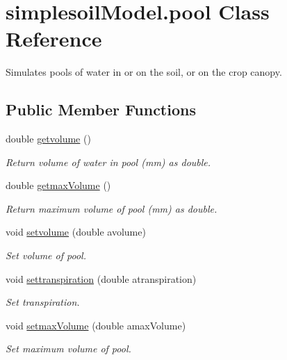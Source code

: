 \hypertarget{classsimplesoil_model_1_1pool}{}\section{simplesoil\+Model.\+pool Class Reference}
\label{classsimplesoil_model_1_1pool}


Simulates pools of water in or on the soil, or on the crop canopy.  


\subsection*{Public Member Functions}
\begin{DoxyCompactItemize}
\item 
double \mbox{\hyperlink{classsimplesoil_model_1_1pool_a29dc8988f752b7b7e1189d2442a431bd}{getvolume}} ()
\begin{DoxyCompactList}\small\item\em Return volume of water in pool (mm) as double. \end{DoxyCompactList}\item 
double \mbox{\hyperlink{classsimplesoil_model_1_1pool_ae038949bd94e78acf1fca1e82e6eae30}{getmax\+Volume}} ()
\begin{DoxyCompactList}\small\item\em Return maximum volume of pool (mm) as double. \end{DoxyCompactList}\item 
void \mbox{\hyperlink{classsimplesoil_model_1_1pool_a2459746f840a3d2a6de1748cd430aafc}{setvolume}} (double avolume)
\begin{DoxyCompactList}\small\item\em Set volume of pool. \end{DoxyCompactList}\item 
void \mbox{\hyperlink{classsimplesoil_model_1_1pool_ac816508405bffebca3d5c475935d642f}{settranspiration}} (double atranspiration)
\begin{DoxyCompactList}\small\item\em Set transpiration. \end{DoxyCompactList}\item 
void \mbox{\hyperlink{classsimplesoil_model_1_1pool_a4afb35706d081f816ac7e0ee97a56018}{setmax\+Volume}} (double amax\+Volume)
\begin{DoxyCompactList}\small\item\em Set maximum volume of pool. \end{DoxyCompactList}\item 

\end{DoxyCompactItemize}

